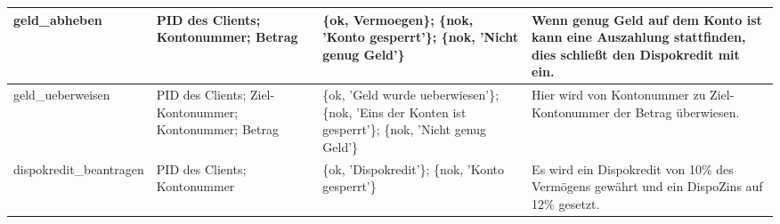 \begin{table}
\begin{center}
\begin{tabular}{p{3 cm}|p{3 cm}|p{3 cm}|p{5 cm}}
geld\_abheben & 
PID des Clients; Kontonummer; Betrag & 
\{ok, Vermoegen\}; \{nok, 'Konto gesperrt'\}; \{nok, 'Nicht genug Geld'\} & 
Wenn genug Geld auf dem Konto ist kann eine Auszahlung stattfinden, dies schließt den Dispokredit mit ein.\\ \hline

geld\_ueberweisen & 
PID des Clients; Ziel-Kontonummer; Kontonummer; Betrag & 
\{ok, 'Geld wurde ueberwiesen'\}; \{nok, 'Eins der Konten ist gesperrt'\}; \{nok, 'Nicht genug Geld'\} & 
Hier wird von Kontonummer zu Ziel-Kontonummer der Betrag überwiesen.\\ \hline

dispokredit\_beantragen & 
PID des Clients; Kontonummer & 
\{ok, 'Dispokredit'\}; \{nok, 'Konto gesperrt'\} & 
Es wird ein Dispokredit von 10\% des Vermögens gewährt und ein DispoZins auf 12\% gesetzt.\\

\end{tabular}\\
\end{center}
\end{table}